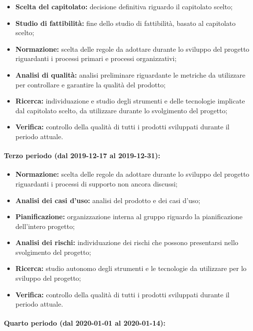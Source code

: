 				\begin{itemize}
					\item \textbf{Scelta del capitolato:} decisione definitiva riguardo il capitolato scelto;
					\item \textbf{Studio di fattibilità:} fine dello studio di fattibilità, basato al capitolato scelto;
					\item \textbf{Normazione:} scelta delle regole da adottare durante lo sviluppo del progetto riguardanti i processi primari e processi organizzativi;
					\item \textbf{Analisi di qualità:} analisi preliminare riguardante le metriche da utilizzare per controllare e garantire la qualità del prodotto;
					\item \textbf{Ricerca:} individuazione e studio degli strumenti e delle tecnologie implicate dal capitolato scelto, da utilizzare durante lo svolgimento del progetto;
					\item \textbf{Verifica:} controllo della qualità di tutti i prodotti sviluppati durante il periodo attuale.
				\end{itemize}
			
			\paragraph{Terzo periodo (dal 2019-12-17 al 2019-12-31):}
			
				\begin{itemize}
					\item \textbf{Normazione:} scelta delle regole da adottare durante lo sviluppo del progetto riguardanti i processi di supporto non ancora discussi;
					\item \textbf{Analisi dei casi d'uso:} analisi del prodotto e dei casi d'uso;
					\item \textbf{Pianificazione:} organizzazione interna al gruppo riguardo la pianificazione dell'intero progetto;
					\item \textbf{Analisi dei rischi:} individuazione dei rischi che possono presentarsi nello svolgimento del progetto;
					\item \textbf{Ricerca:} studio autonomo degli strumenti e le tecnologie da utilizzare per lo sviluppo del progetto;
					\item \textbf{Verifica:} controllo della qualità di tutti i prodotti sviluppati durante il periodo attuale.
				\end{itemize}
			
			\paragraph{Quarto periodo (dal 2020-01-01 al 2020-01-14):}
			
